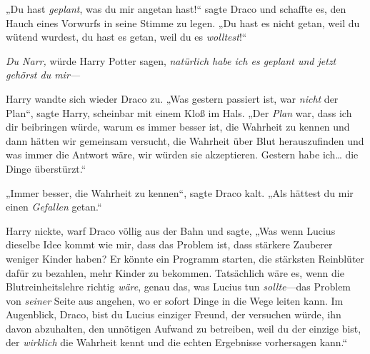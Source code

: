 „Du hast \emph{geplant}, was du mir angetan hast!“ sagte Draco und schaffte es, den Hauch eines Vorwurfs in seine Stimme zu legen. „Du hast es nicht getan, weil du wütend wurdest, du hast es getan, weil du es \emph{wolltest}!“

\emph{Du Narr,} würde Harry Potter sagen, \emph{natürlich habe ich es geplant und jetzt gehörst du mir—}

Harry wandte sich wieder Draco zu. „Was gestern passiert ist, war \emph{nicht} der Plan“, sagte Harry, scheinbar mit einem Kloß im Hals. „Der \emph{Plan} war, dass ich dir beibringen würde, warum es immer besser ist, die Wahrheit zu kennen und dann hätten wir gemeinsam versucht, die Wahrheit über Blut herauszufinden und was immer die Antwort wäre, wir würden sie akzeptieren. Gestern habe ich… die Dinge überstürzt.“

„Immer besser, die Wahrheit zu kennen“, sagte Draco kalt. „Als hättest du mir einen \emph{Gefallen} getan.“

Harry nickte, warf Draco völlig aus der Bahn und sagte, „Was wenn Lucius dieselbe Idee kommt wie mir, dass das Problem ist, dass stärkere Zauberer weniger Kinder haben? Er könnte ein Programm starten, die stärksten Reinblüter dafür zu bezahlen, mehr Kinder zu bekommen. Tatsächlich wäre es, wenn die Blutreinheitslehre richtig \emph{wäre}, genau das, was Lucius tun \emph{sollte}—das Problem von \emph{seiner} Seite aus angehen, wo er sofort Dinge in die Wege leiten kann. Im Augenblick, Draco, bist du Lucius einziger Freund, der versuchen würde, ihn davon abzuhalten, den unnötigen Aufwand zu betreiben, weil du der einzige bist, der \emph{wirklich} die Wahrheit kennt und die echten Ergebnisse vorhersagen kann.“

